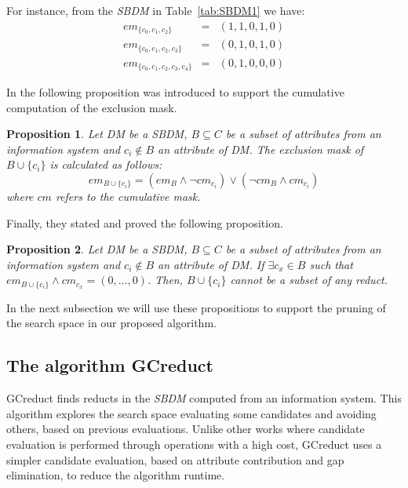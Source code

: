 \documentclass[number,preprint,review,12pt]{elsarticle}
\newtheorem{proposition}{Proposition}
\begin{document}
	For instance, from the \textit{SBDM} in Table~\ref{tab:SBDM1} we have:
	$$\begin{array}{lcc}
	  em_{\lbrace c_0,c_1,c_2\rbrace}         &=& (1,1,0,1,0)\\
	  em_{\lbrace c_0,c_1,c_2,c_3\rbrace}     &=& (0,1,0,1,0)\\
	  em_{\lbrace c_0,c_1,c_2,c_3,c_4\rbrace} &=& (0,1,0,0,0)
	\end{array}$$
	
	In \cite{Lias13} the following proposition was introduced to support the cumulative computation of the exclusion mask.
	
	\begin{proposition}\label{prop:cumul} 
		Let DM be a SBDM, $B \subseteq C$ be a subset of attributes from an information system and $c_i \notin B$ an attribute of DM. The exclusion mask of $B \cup \lbrace c_i\rbrace$ is calculated as follows: $$em_{B \cup \lbrace c_i\rbrace}=(em_B \wedge \neg cm_{c_i}) \vee (\neg cm_B \wedge cm_{c_i})$$	where $cm$ refers to the cumulative mask.
	\end{proposition}
	
	Finally, they stated and proved the following proposition.
	
	\begin{proposition}\label{prop:exclude} 
		Let DM be a SBDM, $B \subseteq C$ be a subset of attributes from an information system and $c_i \notin B$ an attribute of DM. If $\exists c_x \in B$ such that $em_{B \cup \lbrace c_i\rbrace} \wedge cm_{c_x}=(0,...,0)$. Then, $B \cup \lbrace c_i\rbrace$ cannot be a subset of any reduct.
	\end{proposition}
	
	In the next subsection we will use these propositions to support the pruning of the search space in our proposed algorithm.

\subsection{The algorithm GCreduct}\label{description}
	GCreduct finds reducts in the \textit{SBDM} computed from an information system. This algorithm explores the search space evaluating some candidates and avoiding others, based on previous evaluations. Unlike other works \citep{WangP07,Lias13} where candidate evaluation is performed through operations with a high cost, GCreduct uses a simpler candidate evaluation, based on attribute contribution and gap elimination, to reduce the algorithm runtime. 
\end{document}
